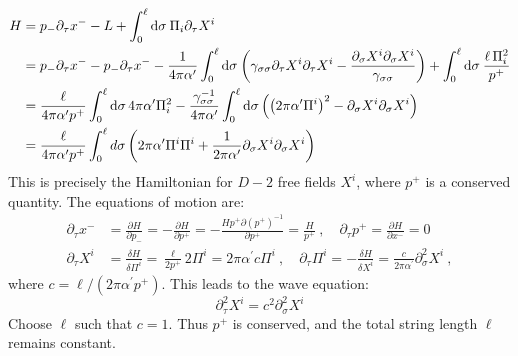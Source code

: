 \begin{align}
	H &=p_{-} \partial_{\tau} x^{-}-L+\int_{0}^{\ell} \mathrm{d} \sigma\: \Pi_{i} \partial_{\tau} X^{i} \nonumber \\
	&= p_{-} \partial_{\tau}  x^{-}-p_{-} \partial_{\tau} x^{-} -\frac{1}{4 \pi \alpha^{\prime}} \int_{0}^{\ell} \mathrm{d} \sigma\:\biggl(\gamma_{\sigma \sigma} \partial_{\tau} X^{i} \partial_{\tau} X^{i}-\frac{\partial_{\sigma} X^{i} \partial_{\sigma} X^{i}}{\gamma_{\sigma \sigma}}\biggr) 
	+\int_{0}^{\ell} \mathrm{d} \sigma\: \frac{\ell\,\Pi_{i}^{2} }{ p^{+}} \nonumber \\
	&=\frac{\ell}{4 \pi \alpha^{\prime} p^{+}} \int_{0}^{\ell} \mathrm{d} \sigma\, 4 \pi \alpha^{\prime}\Pi_{i}^{2} -\frac{\gamma_{\sigma\sigma}^{-1}}{4 \pi \alpha^{\prime}} \int_{0}^{\ell} \mathrm{d} \sigma\,\Bigl(\left(2 \pi \alpha^{\prime} \Pi^{i}\right)^{2}-\partial_\sigma X^{i} \partial _\sigma X^{i} \Bigr)\nonumber \\
	&=\frac{\ell}{4 \pi \alpha^{\prime} p^{+}} \int_{0}^{\ell} d \sigma\left(2 \pi \alpha^{\prime} \Pi^{i} \Pi^{i}+\frac{1}{2 \pi \alpha^{\prime}} \partial_{\sigma} X^{i} \partial_{\sigma} X^{i}\right) \label{1.3.19}
\end{align}
This is precisely the Hamiltonian for $D-2$ free fields $X^i$, where $p^+$ is a conserved quantity. 
The equations of motion are: 
\begin{subequations}
	\begin{align}
		\partial_{\tau} x^{-}&=\frac{\partial H}{\partial p_-}=-\frac{\partial H}{\partial p^{+}}=-\frac{H p^{+} \partial(p^+)^{-1}}{\partial p^{+}}=\frac{H}{p^+} \:,\quad
		\partial_{\tau} p^{+}=\frac{\partial H}{\partial x^{-}}=0 \\
		\partial_{\tau} X^{i}&=\frac{\delta H}{\delta \Pi^{i}}=\frac{\ell}{2 p^{+}} 2 \Pi^{i}=2 \pi\alpha^{\prime}c\Pi^{i} \:,\quad
		\partial_\tau \Pi^{i}=-\frac{\delta H}{\delta X^{i}}=\frac{c}{2 \pi \alpha^{\prime}} \partial_{\sigma}^{2} X^{i} \:,
	\end{align}
\end{subequations}
where $c=\ell/(2 \pi \alpha^{\prime} p^{+})$. 
This leads to the wave equation: 
\begin{equation}
	\partial_{\tau}^{2} X^{i}=c^{2} \partial_{\sigma}^{2} X^{i}
\end{equation}
Choose $\ell$ such that $c=1$. Thus $p^+$ is conserved, and the total string length $\ell$ remains constant. 

